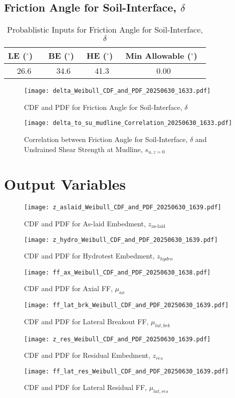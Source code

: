 \documentclass{article}
\begin{document}
\subsection*{Friction Angle for Soil-Interface, $\delta$}
\begin{table}[h!]
\centering
\caption{Probablistic Inputs for Friction Angle for Soil-Interface, $\delta$}
\begin{tabular}{|c|c|c|c|}
\hline
LE ($^\circ$) \ & BE ($^\circ$)\ & HE ($^\circ$)\ & Min Allowable ($^\circ$)\ \\
\hline
26.6 & 34.6 & 41.3 & 0.00 \\
\hline
\end{tabular}
\end{table}
\begin{figure}[h!]
\centering
\texttt{[image: delta\_Weibull\_CDF\_and\_PDF\_20250630\_1633.pdf]}
\caption{CDF and PDF for Friction Angle for Soil-Interface, $\delta$}
\end{figure}
\begin{figure}[h!]
\centering
\texttt{[image: delta\_to\_su\_mudline\_Correlation\_20250630\_1633.pdf]}
\caption{Correlation between Friction Angle for Soil-Interface, $\delta$ and Undrained Shear Strength at Mudline, $s_{{u,z=0}}$}
\end{figure}
\clearpage
\clearpage
\section*{Output Variables}

\begin{figure}[h!]
\centering
\texttt{[image: z\_aslaid\_Weibull\_CDF\_and\_PDF\_20250630\_1639.pdf]}
\caption{CDF and PDF for As-laid Embedment, $z_{\text{as-laid}}$}
\end{figure}
\begin{figure}[h!]
\centering
\texttt{[image: z\_hydro\_Weibull\_CDF\_and\_PDF\_20250630\_1639.pdf]}
\caption{CDF and PDF for Hydrotest Embedment, $z_{hydro}$}
\end{figure}
\begin{figure}[h!]
\centering
\texttt{[image: ff\_ax\_Weibull\_CDF\_and\_PDF\_20250630\_1638.pdf]}
\caption{CDF and PDF for Axial FF, $\mu_{{ax}}$}
\end{figure}
\begin{figure}[h!]
\centering
\texttt{[image: ff\_lat\_brk\_Weibull\_CDF\_and\_PDF\_20250630\_1639.pdf]}
\caption{CDF and PDF for Lateral Breakout FF, $\mu_{{lat,brk}}$}
\end{figure}
\begin{figure}[h!]
\centering
\texttt{[image: z\_res\_Weibull\_CDF\_and\_PDF\_20250630\_1639.pdf]}
\caption{CDF and PDF for Residual Embedment, $z_{res}$}
\end{figure}
\begin{figure}[h!]
\centering
\texttt{[image: ff\_lat\_res\_Weibull\_CDF\_and\_PDF\_20250630\_1639.pdf]}
\caption{CDF and PDF for Lateral Residual FF, $\mu_{{lat,res}}$}
\end{figure}
\end{document}
